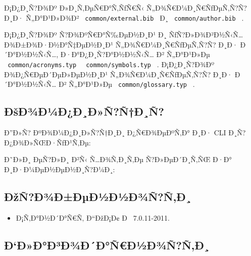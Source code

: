 Ð¡Ð¿Ð¸Ñ?Ð¾Ðº Ð»Ð¸Ñ‚ÐµÑ€Ð°Ñ‚ÑƒÑ€Ñ‹ Ñ„Ð¾Ñ€Ð¼Ð¸Ñ€ÑƒÐµÑ‚Ñ?Ñ? Ð¸Ð·
Ñ„Ð°Ð¹Ð»Ð¾Ð² \texttt{\ common/external.bib\ } Ð¸
\texttt{\ common/author.bib\ } .

Ð¡Ð¿Ð¸Ñ?Ð¾Ðº Ñ?Ð¾ÐºÑ€Ð°Ñ‰ÐµÐ½Ð¸Ð¹ Ð¸ ÑƒÑ?Ð»Ð¾Ð²Ð½Ñ‹Ñ\ldots{}
Ð¾Ð±Ð¾Ð·Ð½Ð°Ñ‡ÐµÐ½Ð¸Ð¹ Ñ„Ð¾Ñ€Ð¼Ð¸Ñ€ÑƒÐµÑ‚Ñ?Ñ? Ð¸Ð· Ð´Ð°Ð½Ð½Ñ‹Ñ\ldots,
Ð·Ð°Ð¿Ð¸Ñ?Ð°Ð½Ð½Ñ‹Ñ\ldots{} Ð² Ñ„Ð°Ð¹Ð»Ðµ
\texttt{\ common/acronyms.typ\ } \texttt{\ common/symbols.typ\ } .
Ð¡Ð¿Ð¸Ñ?Ð¾Ðº Ð¾Ð¿Ñ€ÐµÐ´ÐµÐ»ÐµÐ½Ð¸Ð¹ Ñ„Ð¾Ñ€Ð¼Ð¸Ñ€ÑƒÐµÑ‚Ñ?Ñ? Ð¸Ð·
Ð´Ð°Ð½Ð½Ñ‹Ñ\ldots{} Ð² Ñ„Ð°Ð¹Ð»Ðµ \texttt{\ common/glossary.typ\ } .

\subsection{ÐšÐ¾Ð¼Ð¿Ð¸Ð»Ñ?Ñ†Ð¸Ñ?}\label{uxf0ux161uxf0uxbeuxf0uxbcuxf0uxf0uxf0uxf1uxf1uxf0uxf1}

Ð''Ð»Ñ? ÐºÐ¾Ð¼Ð¿Ð¸Ð»Ñ?Ñ†Ð¸Ð¸ Ð¿Ñ€Ð¾ÐµÐºÑ‚Ð° Ð¸Ð· CLI
Ð¸Ñ?Ð¿Ð¾Ð»ÑŒÐ·ÑƒÐ¹Ñ‚Ðµ:

\begin{Shaded}
\begin{Highlighting}[]
\end{Highlighting}
\end{Shaded}

Ð˜Ð»Ð¸ ÐµÑ?Ð»Ð¸ Ð²Ñ‹ Ñ\ldots Ð¾Ñ‚Ð¸Ñ‚Ðµ Ñ?Ð»ÐµÐ´Ð¸Ñ‚ÑŒ Ð·Ð°
Ð¸Ð·Ð¼ÐµÐ½ÐµÐ½Ð¸Ñ?Ð¼Ð¸:

\begin{Shaded}
\begin{Highlighting}[]
\end{Highlighting}
\end{Shaded}

\subsection{ÐžÑ?Ð¾Ð±ÐµÐ½Ð½Ð¾Ñ?Ñ‚Ð¸}\label{uxf0ux17euxf1uxf0uxbeuxf0uxf0uxb5uxf0uxbduxf0uxbduxf0uxbeuxf1uxf1uxf0}

\begin{itemize}
\tightlist
\item
  Ð¡Ñ‚Ð°Ð½Ð´Ð°Ñ€Ñ‚ Ð``ÐžÐ¡Ð¢ Ð~ 7.0.11-2011.
\end{itemize}

\subsection{Ð`Ð»Ð°Ð³Ð¾Ð´Ð°Ñ€Ð½Ð¾Ñ?Ñ‚Ð¸}\label{uxf0uxf0uxf0uxf0uxb3uxf0uxbeuxf0uxf0uxf1uxf0uxbduxf0uxbeuxf1uxf1uxf0}

